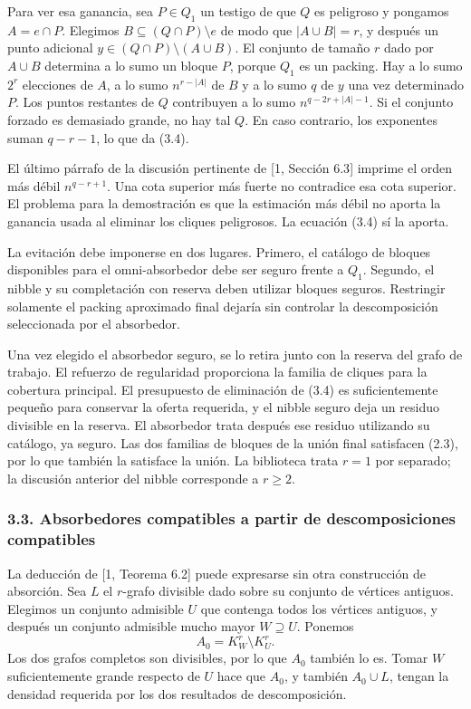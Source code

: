 \documentclass[spanish,11pt,a4paper]{article}
\begin{document}
Para ver esa ganancia, sea \(P\in Q_1\) un testigo de que \(Q\) es peligroso y pongamos \(A=e\cap P\). Elegimos \(B\subseteq(Q\cap P)\setminus e\) de modo que \(|A\cup B|=r\), y después un punto adicional \(y\in(Q\cap P)\setminus(A\cup B)\). El conjunto de tamaño \(r\) dado por \(A\cup B\) determina a lo sumo un bloque \(P\), porque \(Q_1\) es un packing. Hay a lo sumo \(2^r\) elecciones de \(A\), a lo sumo \(n^{r-|A|}\) de \(B\) y a lo sumo \(q\) de \(y\) una vez determinado \(P\). Los puntos restantes de \(Q\) contribuyen a lo sumo \(n^{q-2r+|A|-1}\). Si el conjunto forzado es demasiado grande, no hay tal \(Q\). En caso contrario, los exponentes suman \(q-r-1\), lo que da (3.4).

El último párrafo de la discusión pertinente de {[}1, Sección 6.3{]} imprime el orden más débil \(n^{q-r+1}\). Una cota superior más fuerte no contradice esa cota superior. El problema para la demostración es que la estimación más débil no aporta la ganancia usada al eliminar los cliques peligrosos. La ecuación (3.4) sí la aporta.

La evitación debe imponerse en dos lugares. Primero, el catálogo de bloques disponibles para el omni-absorbedor debe ser seguro frente a \(Q_1\). Segundo, el nibble y su completación con reserva deben utilizar bloques seguros. Restringir solamente el packing aproximado final dejaría sin controlar la descomposición seleccionada por el absorbedor.

Una vez elegido el absorbedor seguro, se lo retira junto con la reserva del grafo de trabajo. El refuerzo de regularidad proporciona la familia de cliques para la cobertura principal. El presupuesto de eliminación de (3.4) es suficientemente pequeño para conservar la oferta requerida, y el nibble seguro deja un residuo divisible en la reserva. El absorbedor trata después ese residuo utilizando su catálogo, ya seguro. Las dos familias de bloques de la unión final satisfacen (2.3), por lo que también la satisface la unión. La biblioteca trata \(r=1\) por separado; la discusión anterior del nibble corresponde a \(r\ge2\).


\subsubsection{3.3. Absorbedores compatibles a partir de descomposiciones compatibles}\label{absorbedores-compatibles-a-partir-de-descomposiciones-compatibles}

La deducción de {[}1, Teorema 6.2{]} puede expresarse sin otra construcción de absorción. Sea \(L\) el \(r\)-grafo divisible dado sobre su conjunto de vértices antiguos. Elegimos un conjunto admisible \(U\) que contenga todos los vértices antiguos, y después un conjunto admisible mucho mayor \(W\supseteq U\). Ponemos \[A_0=K_W^r\setminus K_U^r.
\tag{3.5}\] Los dos grafos completos son divisibles, por lo que \(A_0\) también lo es. Tomar \(W\) suficientemente grande respecto de \(U\) hace que \(A_0\), y también \(A_0\cup L\), tengan la densidad requerida por los dos resultados de descomposición.
\end{document}
